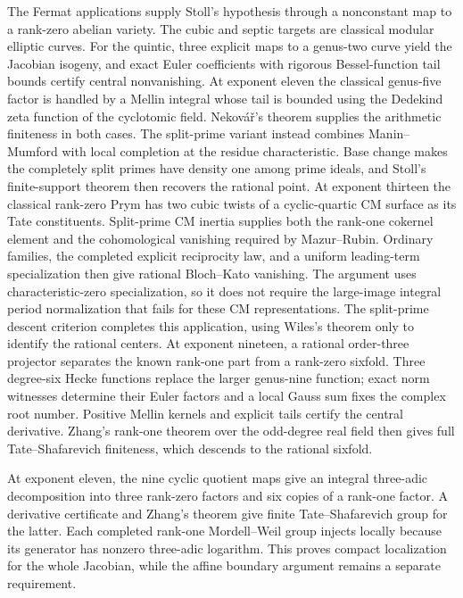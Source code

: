 \documentclass[11pt]{article}
\theoremstyle{definition}
\begin{document}
The Fermat applications supply Stoll's hypothesis through a nonconstant
map to a rank-zero abelian variety. The cubic and septic targets are
classical modular elliptic curves. For the quintic, three explicit
maps to a genus-two curve yield the Jacobian isogeny, and exact Euler
coefficients with rigorous Bessel-function tail bounds certify central
nonvanishing. At exponent eleven the classical genus-five factor is
handled by a Mellin integral whose tail is bounded using the
Dedekind zeta function of the cyclotomic field.
Nekov\'a\v r's theorem supplies the arithmetic finiteness in both cases.
The split-prime variant instead combines Manin--Mumford with local
completion at the residue characteristic. Base change makes the
completely split primes have density one among prime ideals, and
Stoll's finite-support theorem then recovers the rational point.
At exponent thirteen the classical rank-zero Prym has two cubic twists
of a cyclic-quartic CM surface as its Tate constituents. Split-prime
CM inertia supplies both the rank-one cokernel element and the
cohomological vanishing required by Mazur--Rubin. Ordinary families,
the completed explicit reciprocity law, and a uniform leading-term
specialization then give rational Bloch--Kato vanishing. The argument
uses characteristic-zero specialization, so it does not require the
large-image integral period normalization that fails for these CM
representations. The split-prime descent criterion completes this
application, using Wiles's theorem only to identify the rational centers.
At exponent nineteen, a rational order-three projector separates the
known rank-one part from a rank-zero sixfold. Three degree-six
Hecke functions replace the larger genus-nine function; exact norm
witnesses determine their Euler factors and a local Gauss sum fixes
the complex root number. Positive Mellin kernels and explicit tails
certify the central derivative. Zhang's rank-one theorem over the
odd-degree real field then gives full Tate--Shafarevich finiteness,
which descends to the rational sixfold.

At exponent eleven, the nine cyclic quotient maps give an integral
three-adic decomposition into three rank-zero factors and six copies
of a rank-one factor. A derivative certificate and Zhang's theorem
give finite Tate--Shafarevich group for the latter. Each completed
rank-one Mordell--Weil group injects locally because its generator
has nonzero three-adic logarithm. This proves compact localization
for the whole Jacobian, while the affine boundary argument remains
a separate requirement.
\end{document}
